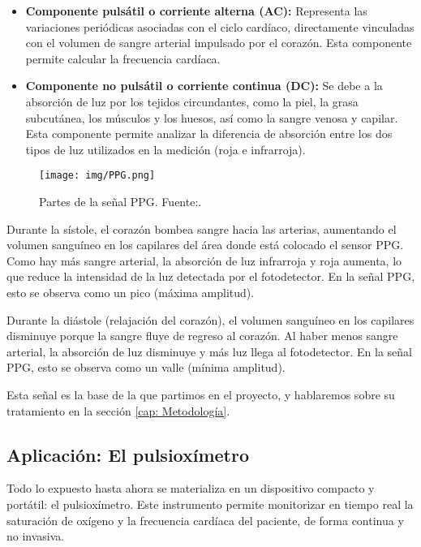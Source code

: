 \begin{itemize}
    \item \textbf{Componente pulsátil o corriente alterna (AC): }Representa las variaciones periódicas asociadas con el ciclo cardíaco, directamente vinculadas con el volumen de sangre arterial impulsado por el corazón. Esta componente permite calcular la frecuencia cardíaca. 
    \item \textbf{Componente no pulsátil o corriente continua (DC): }Se debe a la absorción de luz por los tejidos circundantes, como la piel, la grasa subcutánea, los músculos y los huesos, así como la sangre venosa y capilar. Esta componente permite analizar la diferencia de absorción entre los dos tipos de luz utilizados en la medición (roja e infrarroja)\cite{DeLaPena2017}.
\end{itemize}

\begin{figure}[H]
    \centering
    \texttt{[image: img/PPG.png]}
    \caption{Partes de la señal PPG. Fuente:\cite{Dzedzickis2020}.}
    \label{fig:PPG}
\end{figure}

Durante la sístole, el corazón bombea sangre hacia las arterias, aumentando el volumen sanguíneo en los capilares del área donde está colocado el sensor PPG. Como hay más sangre arterial, la absorción de luz infrarroja y roja aumenta, lo que reduce la intensidad de la luz detectada por el fotodetector. En la señal PPG, esto se observa como un pico (máxima amplitud).

Durante la diástole (relajación del corazón), el volumen sanguíneo en los capilares disminuye porque la sangre fluye de regreso al corazón. Al haber menos sangre arterial, la absorción de luz disminuye y más luz llega al fotodetector. En la señal PPG, esto se observa como un valle (mínima amplitud).


Esta señal es la base de la que partimos en el proyecto, y hablaremos sobre su tratamiento en la sección \ref{cap: Metodología}.

\subsection{Aplicación: El pulsioxímetro}

Todo lo expuesto hasta ahora se materializa en un dispositivo compacto y portátil: el pulsioxímetro. Este instrumento permite monitorizar en tiempo real la saturación de oxígeno y la frecuencia cardíaca del paciente, de forma continua y no invasiva. 

